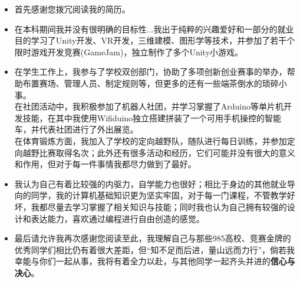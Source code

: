 \begin{itemize}[parsep=0.5ex]
  \item 首先感谢您拨冗阅读我的简历。\\

  \item 在本科期间我并没有很明确的目标性...我出于纯粹的兴趣爱好和一部分的就业目的学习了Unity开发、VR开发，三维建模、图形学等技术，并参加了若干个限时游戏开发竞赛(GameJam)，独立制作了多个Unity小游戏。\\

  \item 在学生工作上，我参与了学校双创部门，协助了多项创新创业赛事的举办，帮助布置赛场、管理人员、制定规则等，但更多的还有一些端茶倒水的琐碎小事。
  \vspace{8pt}\\
 在社团活动中，我积极参加了机器人社团，并学习掌握了Arduino等单片机开发技能，在其中我使用Wifiduino独立搭建拼装了一个可用手机操控的智能车，并代表社团进行了外出展览。
  \vspace{8pt}\\
  在体育锻炼方面，我加入了学校的定向越野队，随队进行每日训练，并参加定向越野比赛取得名次；此外还有很多活动和经历，它们可能并没有很大的意义和作用，但对于每一件事情我都尽力做到了最好。\\

  \item 我认为自己有着比较强的内驱力，自学能力也很好；相比于身边的其他就业导向的同学，我的计算机基础知识更为坚实牢固，对于每一门课程，不管教学好坏，我都尽量去学习掌握了相关知识与技能；同时我也认为自己拥有较强的设计和表达能力，喜欢通过编程进行自由创造的感觉。\\
  
  \item 最后请允许我再次感谢您阅读至此，我理解自己与那些985高校、竞赛金牌的优秀同学们相比仍有着很大差距，但“知不足而后进，量山远而力行”，倘若我幸能与你们一起从事，我将有着全力以赴，与其他同学一起齐头并进的\textbf{信心与决心}。
\end{itemize}

